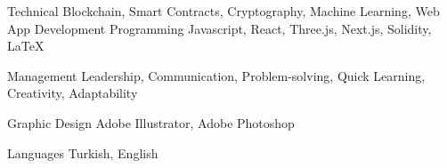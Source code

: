 

\begin{cvskills}

  \cvskill
    {Technical} %
    {Blockchain, Smart Contracts, Cryptography, Machine Learning, Web App Development} %
  \cvskill
    {Programming} %
    {Javascript, React, Three.js, Next.js, Solidity, LaTeX } %

  \cvskill
    {Management} %
    {Leadership, Communication, Problem-solving, Quick Learning, Creativity, Adaptability} %
    
  \cvskill
    {Graphic Design} %
    {Adobe Illustrator, Adobe Photoshop} %

  \cvskill
    {Languages} %
    {Turkish, English} %

\end{cvskills}
